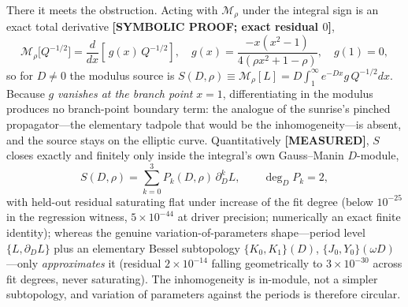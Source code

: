 \documentclass[aps,pra,twocolumn,superscriptaddress,longbibliography]{revtex4-2}
\begin{document}
There it meets the obstruction.  Acting with $\mathcal{M}_{\rho}$ under the
integral sign is an exact total derivative \textbf{[SYMBOLIC PROOF; exact
residual $0$]},
%
\begin{equation}
  \mathcal{M}_{\rho}\big[Q^{-1/2}\big]
  = \frac{d}{dx}\!\left[\,g(x)\,Q^{-1/2}\right],
  \quad
  g(x)=\frac{-x(x^{2}-1)}{4(\rho x^{2}+1-\rho)},
  \quad g(1)=0,
  \label{eq:exactform}
\end{equation}
%
so for $D\neq0$ the modulus source is
$S(D,\rho)\equiv\mathcal{M}_{\rho}[L]=D\!\int_{1}^{\infty}e^{-Dx}g\,Q^{-1/2}dx$.
Because $g$ \emph{vanishes at the branch point} $x=1$, differentiating in the
modulus produces no branch-point boundary term: the analogue of the sunrise's
pinched propagator---the elementary tadpole that would be the
inhomogeneity---is absent, and the source stays on the elliptic curve.
Quantitatively \textbf{[MEASURED]}, $S$ closes exactly and
finitely only inside the integral's own Gauss--Manin $D$-module,
%
\begin{equation}
  S(D,\rho)=\sum_{k=0}^{3}P_{k}(D,\rho)\,\partial_{D}^{k}L,
  \qquad \deg_{D}P_{k}=2,
  \label{eq:inmodule}
\end{equation}
%
with held-out residual saturating flat under increase of the fit degree
(below $10^{-25}$ in the regression witness, $5\times10^{-44}$ at driver
precision; numerically an exact finite identity); whereas the genuine
variation-of-parameters shape---period level $\{L,\partial_{D}L\}$ plus an
elementary Bessel subtopology $\{K_{0},K_{1}\}(D)$, $\{J_{0},Y_{0}\}(\omega
D)$---only \emph{approximates} it (residual $2\times10^{-14}$ falling
geometrically to $3\times10^{-30}$ across fit degrees, never saturating).  The
inhomogeneity is in-module, not a simpler subtopology, and variation of
parameters against the periods is therefore circular.
\end{document}
